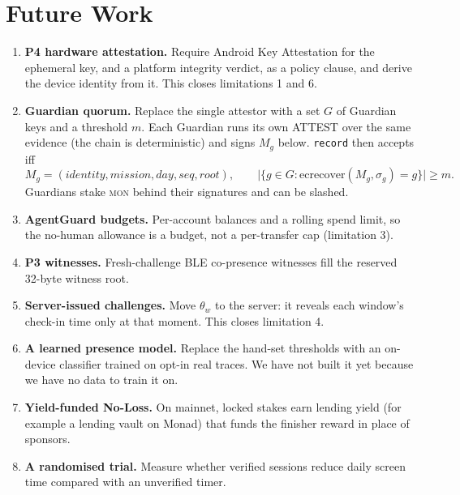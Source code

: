 \documentclass[10pt]{article}
\newcommand{\code}[1]{\texttt{\small #1}}
\newcommand{\mon}{\textsc{mon}}
\begin{document}
\section{Future Work}\label{sec:future}
\begin{enumerate}
\item \textbf{P4 hardware attestation.} Require Android Key Attestation for the ephemeral key, and a platform integrity
verdict, as a policy clause, and derive the device identity from it. This closes limitations 1 and 6.
\item \textbf{Guardian quorum.} Replace the single attestor with a set $G$ of Guardian keys and a threshold $m$. Each
Guardian runs its own ATTEST over the same evidence (the chain is deterministic) and signs $M_g$ below.
\code{record} then accepts iff
\[M_g=(\textit{identity},\textit{mission},\textit{day},\textit{seq},\textit{root}),\qquad
\big|\{g\in G:\mathrm{ecrecover}(M_g,\sigma_g)=g\}\big|\ge m .\]
Guardians stake \mon{} behind their signatures and can be slashed.
\item \textbf{AgentGuard budgets.} Per-account balances and a rolling spend limit, so the no-human allowance is a budget,
not a per-transfer cap (limitation 3).
\item \textbf{P3 witnesses.} Fresh-challenge BLE co-presence witnesses fill the reserved 32-byte witness root.
\item \textbf{Server-issued challenges.} Move $\theta_w$ to the server: it reveals each window's check-in time only at
that moment. This closes limitation 4.
\item \textbf{A learned presence model.} Replace the hand-set thresholds with an on-device classifier trained on opt-in
real traces. We have not built it yet because we have no data to train it on.
\item \textbf{Yield-funded No-Loss.} On mainnet, locked stakes earn lending yield (for example a lending vault on Monad)
that funds the finisher reward in place of sponsors.
\item \textbf{A randomised trial.} Measure whether verified sessions reduce daily screen time compared with an unverified
timer.
\end{enumerate}
\end{document}
